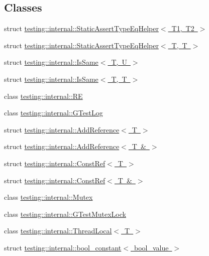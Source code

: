 \subsection*{Classes}
\begin{DoxyCompactItemize}
\item 
struct \mbox{\hyperlink{structtesting_1_1internal_1_1_static_assert_type_eq_helper}{testing\+::internal\+::\+Static\+Assert\+Type\+Eq\+Helper$<$ T1, T2 $>$}}
\item 
struct \mbox{\hyperlink{structtesting_1_1internal_1_1_static_assert_type_eq_helper_3_01_t_00_01_t_01_4}{testing\+::internal\+::\+Static\+Assert\+Type\+Eq\+Helper$<$ T, T $>$}}
\item 
struct \mbox{\hyperlink{structtesting_1_1internal_1_1_is_same}{testing\+::internal\+::\+Is\+Same$<$ T, U $>$}}
\item 
struct \mbox{\hyperlink{structtesting_1_1internal_1_1_is_same_3_01_t_00_01_t_01_4}{testing\+::internal\+::\+Is\+Same$<$ T, T $>$}}
\item 
class \mbox{\hyperlink{classtesting_1_1internal_1_1_r_e}{testing\+::internal\+::\+RE}}
\item 
class \mbox{\hyperlink{classtesting_1_1internal_1_1_g_test_log}{testing\+::internal\+::\+G\+Test\+Log}}
\item 
struct \mbox{\hyperlink{structtesting_1_1internal_1_1_add_reference}{testing\+::internal\+::\+Add\+Reference$<$ T $>$}}
\item 
struct \mbox{\hyperlink{structtesting_1_1internal_1_1_add_reference_3_01_t_01_6_01_4}{testing\+::internal\+::\+Add\+Reference$<$ T \& $>$}}
\item 
struct \mbox{\hyperlink{structtesting_1_1internal_1_1_const_ref}{testing\+::internal\+::\+Const\+Ref$<$ T $>$}}
\item 
struct \mbox{\hyperlink{structtesting_1_1internal_1_1_const_ref_3_01_t_01_6_01_4}{testing\+::internal\+::\+Const\+Ref$<$ T \& $>$}}
\item 
class \mbox{\hyperlink{classtesting_1_1internal_1_1_mutex}{testing\+::internal\+::\+Mutex}}
\item 
class \mbox{\hyperlink{classtesting_1_1internal_1_1_g_test_mutex_lock}{testing\+::internal\+::\+G\+Test\+Mutex\+Lock}}
\item 
class \mbox{\hyperlink{classtesting_1_1internal_1_1_thread_local}{testing\+::internal\+::\+Thread\+Local$<$ T $>$}}
\item 
struct \mbox{\hyperlink{structtesting_1_1internal_1_1bool__constant}{testing\+::internal\+::bool\+\_\+constant$<$ bool\+\_\+value $>$}}

\end{DoxyCompactItemize}
